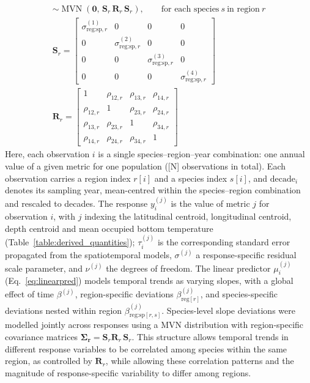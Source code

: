 \documentclass[9pt,twocolumn,twoside]{pnas-new}
\begin{document}
{\begin{gather}
\sim 
\operatorname{MVN}\!\left(
\mathbf{0},\,
\mathbf{S}_{r}\,\mathbf{R}_{r}\,\mathbf{S}_{r}
\right),
\qquad \text{for each species}~s~\text{in region}~r \label{eq:mvn}
\\
\mathbf{S}_{r} =
\begin{bmatrix}
\sigma^{(1)}_{\text{reg:sp},r} & 0 & 0 & 0 \\
0 & \sigma^{(2)}_{\text{reg:sp},r} & 0 & 0 \\
0 & 0 & \sigma^{(3)}_{\text{reg:sp},r} & 0 \\
0 & 0 & 0 & \sigma^{(4)}_{\text{reg:sp},r}
\end{bmatrix} \label{eq:sdmatrix}
\\
\mathbf{R}_{r} =
\begin{bmatrix}
1 & \rho_{12,r} & \rho_{13,r} & \rho_{14,r} \\
\rho_{12,r} & 1 & \rho_{23,r} & \rho_{24,r} \\
\rho_{13,r} & \rho_{23,r} & 1 & \rho_{34,r} \\
\rho_{14,r} & \rho_{24,r} & \rho_{34,r} & 1
\end{bmatrix} \label{eq:corrmatrix}
\end{gather}
\noindent Here, each observation $i$ is a single species--region--year combination: one annual value of a given metric for one population ([N] observations in total). Each observation carries a region index $r[i]$ and a species index $s[i]$, and $\mathrm{decade}_i$ denotes its sampling year, mean-centred within the species--region combination and rescaled to decades. The response $y^{(j)}_i$ is the value of metric $j$ for observation $i$, with $j$ indexing the latitudinal centroid, longitudinal centroid, depth centroid and mean occupied bottom temperature (Table~\ref{table:derived_quantities}); $\tau^{(j)}_i$ is the corresponding standard error propagated from the spatiotemporal models, $\sigma^{(j)}$ a response-specific residual scale parameter, and $\nu^{(j)}$ the degrees of freedom. The linear predictor $\mu^{(j)}_i$ (Eq.~\ref{eq:linearpred}) models temporal trends as varying slopes, with a global effect of time $\beta^{(j)}$, region-specific deviations $\beta^{(j)}_{\text{reg}[r]}$, and species-specific deviations nested within region $\beta^{(j)}_{\text{reg:sp}[r,s]}$.
Species-level slope deviations were modelled jointly across responses using a MVN distribution with region-specific covariance matrices $\boldsymbol{\Sigma_r} = \mathbf{S}_{r}\mathbf{R}_{r}\,\mathbf{S}_{r}$. This structure allows temporal trends in different response variables to be correlated among species within the same region, as controlled by $\mathbf{R}_{r}$, while allowing these correlation patterns and the magnitude of response-specific variability to differ among regions.
}
\end{document}
